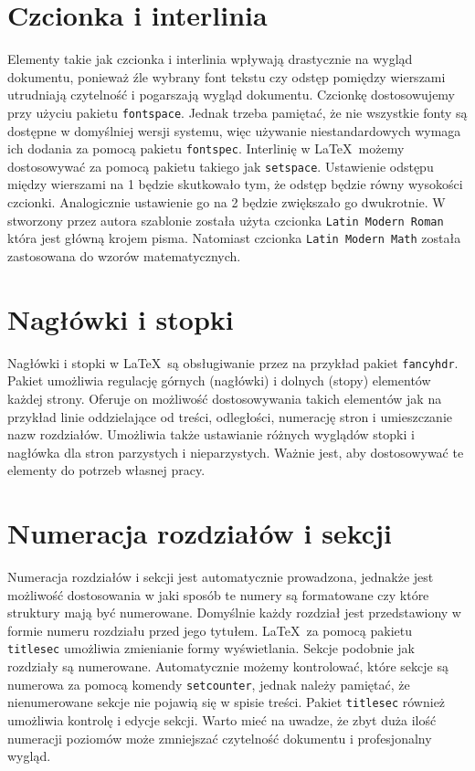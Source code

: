 \section{Czcionka i interlinia}
Elementy takie jak czcionka i interlinia wpływają drastycznie na wygląd dokumentu, ponieważ źle wybrany font tekstu czy odstęp pomiędzy wierszami utrudniają czytelność i pogarszają wygląd dokumentu. Czcionkę dostosowujemy przy użyciu pakietu \texttt{fontspace}. Jednak trzeba pamiętać, że nie wszystkie fonty są dostępne w domyślniej wersji systemu, więc używanie niestandardowych wymaga ich dodania za pomocą pakietu \texttt{fontspec}. Interlinię w \LaTeX\ możemy dostosowywać za pomocą pakietu takiego jak \texttt{setspace}. Ustawienie odstępu między wierszami na 1 będzie skutkowało tym, że odstęp będzie równy wysokości czcionki. Analogicznie ustawienie go na 2 będzie zwiększało go dwukrotnie. W stworzony przez autora szablonie została użyta czcionka \texttt{Latin Modern Roman} która jest główną krojem pisma. Natomiast  czcionka \texttt{Latin Modern Math} została zastosowana do wzorów matematycznych. 

\section{Nagłówki i stopki}
Nagłówki i stopki w \LaTeX\ są obsługiwanie przez na przykład pakiet \texttt{fancyhdr}. Pakiet umożliwia regulację górnych (nagłówki) i dolnych (stopy) elementów każdej strony. Oferuje on możliwość dostosowywania takich elementów jak na przykład linie oddzielające od treści, odległości, numerację stron i umieszczanie nazw rozdziałów. Umożliwia także ustawianie różnych wyglądów stopki i nagłówka dla stron parzystych i nieparzystych. Ważnie jest, aby dostosowywać te elementy do potrzeb własnej pracy.

\section{Numeracja rozdziałów i sekcji}
Numeracja rozdziałów i sekcji jest automatycznie prowadzona, jednakże jest możliwość dostosowania w jaki sposób te numery są formatowane czy które struktury mają być numerowane. Domyślnie każdy rozdział jest przedstawiony w formie numeru rozdziału przed jego tytułem. \LaTeX\ za pomocą pakietu \texttt{titlesec} umożliwia zmienianie formy wyświetlania. Sekcje podobnie jak rozdziały są numerowane. Automatycznie możemy kontrolować, które sekcje są numerowa za pomocą komendy \texttt{setcounter}, jednak należy pamiętać, że nienumerowane sekcje nie pojawią się w spisie treści. Pakiet \texttt{titlesec} również umożliwia kontrolę i edycje sekcji. Warto mieć na uwadze, że zbyt duża ilość numeracji poziomów może zmniejszać czytelność dokumentu i profesjonalny wygląd. 

